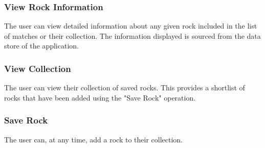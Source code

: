 \documentclass[titlepage]{article}
\begin{document}
  \subsubsection{View Rock Information}
    The user can view detailed information about any given rock included in the list of matches or their collection. The information displayed is sourced from the data store of the application.
  \subsubsection{View Collection}
    The user can view their collection of saved rocks. This provides a shortlist of rocks that have been added using the "Save Rock" operation. 
  \subsubsection{Save Rock}
    The user can, at any time, add a rock to their collection.
\end{document}
